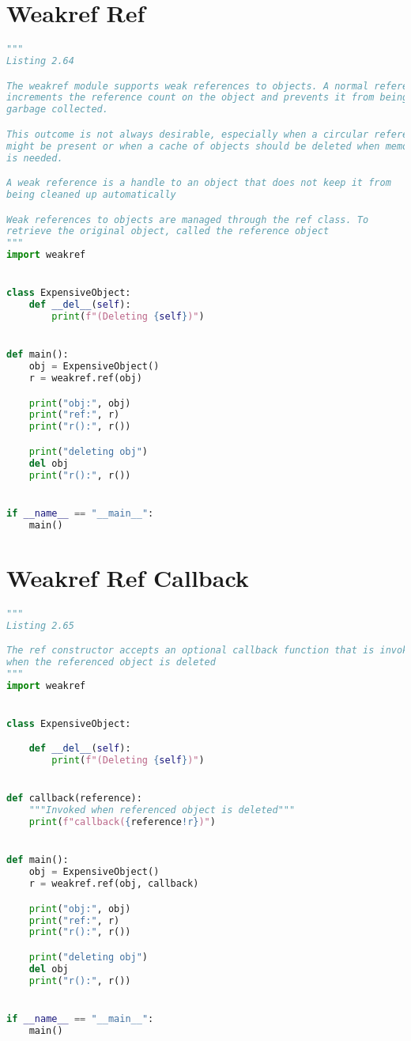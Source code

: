 \documentclass[a4paper,landscape]{report}
\begin{document}
\section{Weakref Ref}
\begin{lstlisting}[language=Python]
"""
Listing 2.64

The weakref module supports weak references to objects. A normal reference
increments the reference count on the object and prevents it from being
garbage collected.

This outcome is not always desirable, especially when a circular reference
might be present or when a cache of objects should be deleted when memory
is needed.

A weak reference is a handle to an object that does not keep it from
being cleaned up automatically

Weak references to objects are managed through the ref class. To
retrieve the original object, called the reference object
"""
import weakref


class ExpensiveObject:
    def __del__(self):
        print(f"(Deleting {self})")


def main():
    obj = ExpensiveObject()
    r = weakref.ref(obj)

    print("obj:", obj)
    print("ref:", r)
    print("r():", r())

    print("deleting obj")
    del obj
    print("r():", r())


if __name__ == "__main__":
    main()

\end{lstlisting}
\section{Weakref Ref Callback}
\begin{lstlisting}[language=Python]
"""
Listing 2.65

The ref constructor accepts an optional callback function that is invoked
when the referenced object is deleted
"""
import weakref


class ExpensiveObject:

    def __del__(self):
        print(f"(Deleting {self})")


def callback(reference):
    """Invoked when referenced object is deleted"""
    print(f"callback({reference!r})")


def main():
    obj = ExpensiveObject()
    r = weakref.ref(obj, callback)

    print("obj:", obj)
    print("ref:", r)
    print("r():", r())

    print("deleting obj")
    del obj
    print("r():", r())


if __name__ == "__main__":
    main()

\end{lstlisting}
\end{document}
